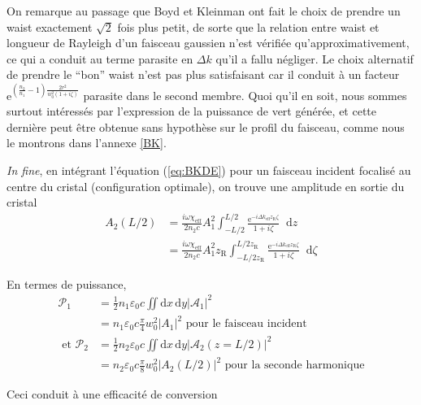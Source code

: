 \documentclass[11pt,a4paper]{article}
\newcommand{\diff}{\mathop{}\!\mathrm{d}}
\newcommand{\zr}{z_\mathsc{R}}
\renewcommand{\P}{\mathscr{P}}
\newcommand{\A}{\mathcal{A}}
\newcommand{\e}[1]{\text{e}^{#1}}
\newcommand{\mathsc}[1]{\mathrm{\scriptscriptstyle {#1}}}
\begin{document}
On remarque au passage que Boyd et Kleinman ont fait le choix de prendre un waist exactement $\sqrt{2}$ fois plus petit, de sorte que la relation entre waist et longueur de Rayleigh d'un faisceau gaussien n'est vérifiée qu'approximativement, ce qui a conduit au terme parasite en $\Delta k$ qu'il a fallu négliger. Le choix alternatif de prendre le ``bon'' waist n'est pas plus satisfaisant car il conduit à un facteur $\e{ \left(\frac{n_2}{n_1}-1\right) \frac{2 r^2}{w_0^2(1+i\zeta)}}$ parasite dans le second membre. Quoi qu'il en soit, nous sommes surtout intéressés par l'expression de la puissance de vert générée, et cette dernière peut être obtenue sans hypothèse sur le profil du faisceau, comme nous le montrons dans l'annexe \ref{BK}. 

\textit{In fine}, en intégrant l'équation (\ref{eq:BKDE}) pour un faisceau incident focalisé au centre du cristal (configuration optimale), on trouve une amplitude en sortie du cristal
\begin{align} 
	A_2(L/2) &= \frac{i\omega \chi_\mathsc{eff}}{2 n_2 c} A_1^2 \int_{-L/2}^{L/2} \frac{\e{-i\Delta k_\mathsc{eff} \zr \zeta}}{1+i\zeta} \diff z \\
	&= \frac{i\omega \chi_\mathsc{eff}}{2 n_2 c} A_1^2 \zr \int_{-L/2\zr}^{L/2\zr} \frac{\e{-i\Delta k_\mathsc{eff} \zr \zeta}}{1+i\zeta} \diff \zeta
\end{align}

En termes de puissance,
\begin{align} 
	\P_1 &= \frac12 n_1 \varepsilon_0 c \iint \mathrm dx \, \mathrm dy |\A_1|^2 \\
	&= n_1\varepsilon_0c \frac\pi4 w_0^2 |A_1|^2 \text{ pour le faisceau incident } \\
	\text{ et } \P_2 &= \frac12 n_2 \varepsilon_0 c \iint \mathrm dx \, \mathrm dy |\A_2(z=L/2)|^2 \\
	&= n_2\varepsilon_0c \frac\pi8 w_0^2 |A_2(L/2)|^2 \text{ pour la seconde harmonique}
\end{align}

Ceci conduit à une efficacité de conversion
\end{document}
